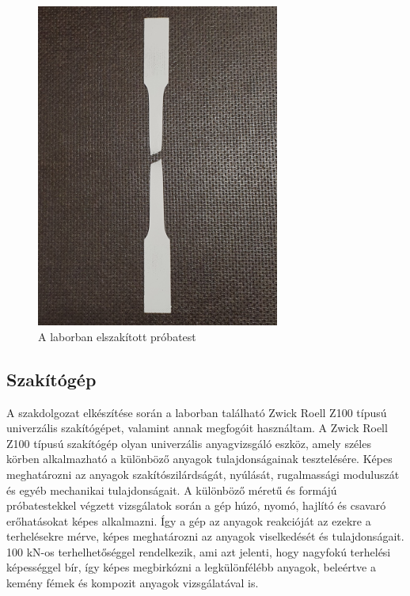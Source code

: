 \documentclass[12pt,a4paper,oneside]{report}
\begin{document}
\begin{figure}[H]
\centering
\includegraphics[width=8cm]{figures/probatest_eltort}
\caption{A laborban elszakított próbatest}
\label{Fig:probatest_eltort}
\end{figure}

\subsection{Szakítógép}
A szakdolgozat elkészítése során a laborban található Zwick Roell Z100 típusú univerzális szakítógépet, valamint annak megfogóit használtam. A Zwick Roell Z100 típusú szakítógép olyan univerzális anyagvizsgáló eszköz, amely széles körben alkalmazható a különböző anyagok tulajdonságainak tesztelésére. Képes meghatározni az anyagok szakítószilárdságát, nyúlását, rugalmassági moduluszát és egyéb mechanikai tulajdonságait. A különböző méretű és formájú próbatestekkel végzett vizsgálatok során a gép húzó, nyomó, hajlító és csavaró erőhatásokat képes alkalmazni. Így a gép az anyagok reakcióját az ezekre a terhelésekre mérve, képes meghatározni az anyagok viselkedését és tulajdonságait.
100 kN-os terhelhetőséggel rendelkezik, ami azt jelenti, hogy nagyfokú terhelési képességgel bír, így képes megbirkózni a legkülönfélébb anyagok, beleértve a kemény fémek és kompozit anyagok vizsgálatával is.
\end{document}

